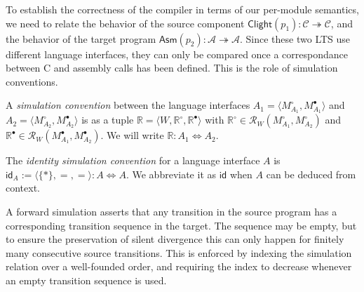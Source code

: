 \documentclass[sigplan,10pt,review,anonymous]{acmart}
\newcommand{\kw}[1]{\ensuremath{ \mathsf{#1} }}
\newcommand{\que}{\circ}
\newcommand{\ans}{\bullet}
\begin{document}
To establish the correctness of the compiler
in terms of our per-module semantics,
we need to relate the behavior of the source component
$\kw{Clight}(p_1) : \mathcal{C} \twoheadrightarrow \mathcal{C}$,
and the behavior of the target program
$\kw{Asm}(p_2) : \mathcal{A} \twoheadrightarrow \mathcal{A}$.
Since these two LTS
use different language interfaces,
they can only be compared once a correspondance between
C and assembly calls has been defined.
This is the role of simulation conventions.

\begin{definition} \label{def:simconv} %
A \emph{simulation convention} between the language interfaces
$A_1 = \langle M_{A_1}^\que, M_{A_1}^\ans \rangle$ and
$A_2 = \langle M_{A_2}^\que, M_{A_2}^\ans \rangle$
is as a tuple $\mathbb{R} = \langle W, \mathbb{R}^\que, \mathbb{R}^\ans \rangle$
with $\mathbb{R}^\que \in \mathcal{R}_W(M_{A_1}^\que, M_{A_2}^\que)$
and $\mathbb{R}^\ans \in \mathcal{R}_W(M_{A_1}^\ans, M_{A_2}^\ans)$.
We will write $\mathbb{R} : A_1 \Leftrightarrow A_2$.
\end{definition}

\begin{definition} %
The \emph{identity simulation convention} for
a language interface $A$ is
$\kw{id}_A := \langle \{*\}, {=}, {=} \rangle : A \Leftrightarrow A$.
We abbreviate it as $\kw{id}$ when $A$ can be deduced
from context.
\end{definition}


A forward simulation asserts that any transition in the source program
has a corresponding transition sequence in the target.
The sequence may be empty,
but to ensure the preservation of silent divergence
this can only happen for finitely many consecutive source transitions.
This is enforced by indexing the simulation relation
over a well-founded order,
and requiring the index to decrease
whenever an empty transition sequence is used.
\end{document}
